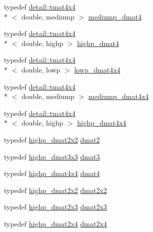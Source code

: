 \begin{DoxyCompactItemize}
\item 
typedef \hyperlink{structglm_1_1detail_1_1tmat4x4}{detail\-::tmat4x4}\\*
$<$ double, mediump $>$ \hyperlink{group__core__precision_ga73de517f040f7d50746bbe273a396685}{mediump\-\_\-dmat4}
\item 
typedef \hyperlink{structglm_1_1detail_1_1tmat4x4}{detail\-::tmat4x4}\\*
$<$ double, highp $>$ \hyperlink{group__core__precision_ga9a5d95e476d451d28d3939ac7f124baf}{highp\-\_\-dmat4}
\item 
typedef \hyperlink{structglm_1_1detail_1_1tmat4x4}{detail\-::tmat4x4}\\*
$<$ double, lowp $>$ \hyperlink{group__core__precision_gac762dec40f53114dfe6894499a2c9a79}{lowp\-\_\-dmat4x4}
\item 
typedef \hyperlink{structglm_1_1detail_1_1tmat4x4}{detail\-::tmat4x4}\\*
$<$ double, mediump $>$ \hyperlink{group__core__precision_gad64329d45b05417ccf0cc3c23f584d26}{mediump\-\_\-dmat4x4}
\item 
typedef \hyperlink{structglm_1_1detail_1_1tmat4x4}{detail\-::tmat4x4}\\*
$<$ double, highp $>$ \hyperlink{group__core__precision_ga1c0a2edbde597b59e9005691a224b208}{highp\-\_\-dmat4x4}
\item 
typedef \hyperlink{group__core__precision_gaa5e35f6570d394c1cd34f411a473220c}{highp\-\_\-dmat2x2} \hyperlink{group__core__types_gad8c130d26c4cd9a1a831c1a74292a8f6}{dmat2}
\item 
typedef \hyperlink{group__core__precision_gad7229dea82287910d88e6e8566e39fc7}{highp\-\_\-dmat3x3} \hyperlink{group__core__types_ga25fd62195c3ef5ac0d32ead1dbfbb929}{dmat3}
\item 
typedef \hyperlink{group__core__precision_ga1c0a2edbde597b59e9005691a224b208}{highp\-\_\-dmat4x4} \hyperlink{group__core__types_ga7f7c1300ebfd19d573e9deb1e8758b54}{dmat4}
\item 
typedef \hyperlink{group__core__precision_gaa5e35f6570d394c1cd34f411a473220c}{highp\-\_\-dmat2x2} \hyperlink{group__core__types_gae9932771e11a4f38e21f1136423bab18}{dmat2x2}
\item 
typedef \hyperlink{group__core__precision_gafec7367665f006f2a7643103c5eddc38}{highp\-\_\-dmat2x3} \hyperlink{group__core__types_ga6b5ff9888ca0e468f35b637d4c3a361d}{dmat2x3}
\item 
typedef \hyperlink{group__core__precision_gacd51d8188f7d66a83c035b8c4cd69f2d}{highp\-\_\-dmat2x4} \hyperlink{group__core__types_ga2d1dd4b4925d1ea67539902c820483a0}{dmat2x4}

\end{DoxyCompactItemize}
